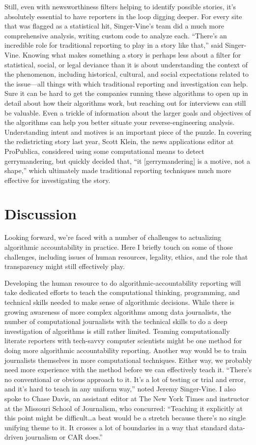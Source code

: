 Still, even with newsworthiness filters helping to identify possible stories, it's absolutely essential to have reporters in the loop digging deeper. For every site that was flagged as a statistical hit, Singer-Vine's team did a much more comprehensive analysis, writing custom code to analyze each. ``There's an incredible role for traditional reporting to play in a story like that,'' said Singer-Vine. Knowing what makes something a story is perhaps less about a filter for statistical, social, or legal deviance than it is about understanding the context of the phenomenon, including historical, cultural, and social expectations related to the issue—all things with which traditional reporting and investigation can help. Sure it can be hard to get the companies running these algorithms to open up in detail about how their algorithms work, but reaching out for interviews can still be valuable. Even a trickle of information about the larger goals and objectives of the algorithms can help you better situate your reverse-engineering analysis. Understanding intent and motives is an important piece of the puzzle. In covering the redistricting story last year, Scott Klein, the news applications editor at ProPublica, considered using some computational means to detect gerrymandering, but quickly decided that, ``it [gerrymandering] is a motive, not a shape,'' which ultimately made traditional reporting techniques much more effective for investigating the story.

\chapter{Discussion }
Looking forward, we're faced with a number of challenges to actualizing algorithmic accountability in practice. Here I briefly touch on some of those challenges, including issues of human resources, legality, ethics, and the role that transparency might still effectively play. 

Developing the human resource to do algorithmic-accountability reporting will take dedicated efforts to teach the computational thinking, programming, and technical skills needed to make sense of algorithmic decisions. While there is growing awareness of more complex algorithms among data journalists, the number of computational journalists with the technical skills to do a deep investigation of algorithms is still rather limited. Teaming computationally literate reporters with tech-savvy computer scientists might be one method for doing more algorithmic accountability reporting. Another way would be to train journalists themselves in more computational techniques. Either way, we probably need more experience with the method before we can effectively teach it. ``There's no conventional or obvious approach to it. It's a lot of testing or trial and error, and it's hard to teach in any uniform way,'' noted Jeremy Singer-Vine. I also spoke to Chase Davis, an assistant editor at The New York Times and instructor at the Missouri School of Journalism, who concurred: ``Teaching it explicitly at this point might be difficult…a beat would be a stretch because there's no single unifying theme to it. It crosses a lot of boundaries in a way that standard data-driven journalism or CAR does.'' 

